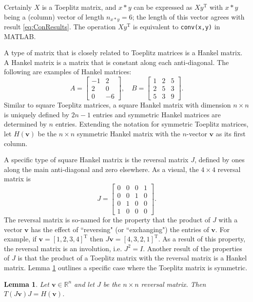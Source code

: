\documentclass[12pt]{book}
\newcommand{\trans}{\mathrm{T}}	%
\newtheorem{lemma}{Lemma}[section]
\begin{document}
Certainly $X$ is a Toeplitz matrix, and $x*y$ can be expressed as $Xy^\trans$ with $x*y$ being a (column) vector of length $n_{x*y} = 6$; the length of this vector agrees with result \eqref{eq:ConResults}. The operation $Xy^\trans$ is equivalent to \texttt{conv(x,y)} in MATLAB. \par 
A type of matrix that is closely related to Toeplitz matrices is a Hankel matrix. A Hankel matrix is a matrix that is constant along each anti-diagonal. The following are examples of Hankel matrices:
\[A = \begin{bmatrix}
-1 & 2 \\
2 & 0 \\
0 & -6
\end{bmatrix}, \quad 
B = \begin{bmatrix}
1 & 2 & 5 \\
2 & 5 & 3 \\
5 & 3 & 9
\end{bmatrix}.\]
Similar to square Toeplitz matrices, a square Hankel matrix with dimension $n \times n$ is uniquely defined by $2n -1$ entries and symmetric Hankel matrices are determined by $n$ entries. Extending the notation for symmetric Toeplitz matrices, let $H(\mathbf{v})$ be the $n \times n$ symmetric Hankel matrix with the $n$-vector $\mathbf{v}$ as its first column. \par
A specific type of square Hankel matrix is the reversal matrix $J$, defined by ones along the main anti-diagonal and zero elsewhere. As a visual, the $4 \times 4$ reversal matrix is
\[J = \begin{bmatrix}
0 & 0 & 0 & 1 \\
0 & 0 & 1 & 0 \\
0 & 1 & 0 & 0 \\
1 & 0  & 0 & 0
\end{bmatrix}.\]
The reversal matrix is so-named for the property that the product of $J$ with a vector $\mathbf{v}$ has the effect of ``reversing" (or ``exchanging") the entries of $\mathbf{v}$. For example, if $\mathbf{v} = [1,2,3,4]^\trans$ then $J\mathbf{v} = [4,3,2,1]^\trans$. As a result of this property, the reversal matrix is an involution, i.e. $J^2 = I$. Another result of the properties of $J$ is that the product of a Toeplitz matrix with the reversal matrix is a Hankel matrix. Lemma \ref{lem:TJ = H} outlines a specific case where the Toeplitz matrix is symmetric.
\begin{lemma}
\label{lem:TJ = H}
Let $\mathbf{v} \in \mathbb{R}^n$ and let $J$ be the $n \times n$ reversal matrix. Then $T(J\mathbf{v})J = H(\mathbf{v})$.
\end{lemma}
\end{document}
